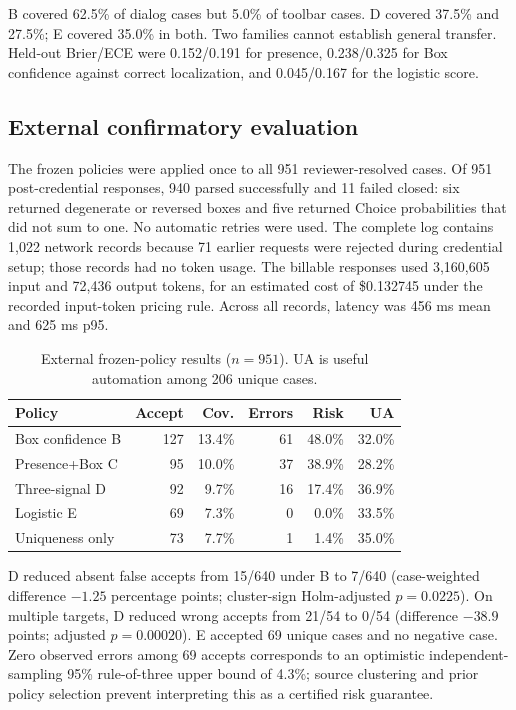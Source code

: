 \documentclass[10pt,twocolumn]{article}
\begin{document}
B covered 62.5\% of dialog cases but 5.0\% of toolbar cases. D covered 37.5\% and 27.5\%; E covered 35.0\% in both. Two families cannot establish general transfer. Held-out Brier/ECE were 0.152/0.191 for presence, 0.238/0.325 for Box confidence against correct localization, and 0.045/0.167 for the logistic score.

\subsection{External confirmatory evaluation}
The frozen policies were applied once to all 951 reviewer-resolved cases. Of 951 post-credential responses, 940 parsed successfully and 11 failed closed: six returned degenerate or reversed boxes and five returned Choice probabilities that did not sum to one. No automatic retries were used. The complete log contains 1,022 network records because 71 earlier requests were rejected during credential setup; those records had no token usage. The billable responses used 3,160,605 input and 72,436 output tokens, for an estimated cost of \$0.132745 under the recorded input-token pricing rule. Across all records, latency was 456 ms mean and 625 ms p95.

\begin{table}[t]
\centering
\caption{External frozen-policy results ($n=951$). UA is useful automation among 206 unique cases.}
\label{tab:external}
\small
\begin{tabular}{lrrrrr}
\toprule
Policy & Accept & Cov. & Errors & Risk & UA \\
\midrule
Box confidence B & 127 & 13.4\% & 61 & 48.0\% & 32.0\%\\
Presence+Box C & 95 & 10.0\% & 37 & 38.9\% & 28.2\%\\
Three-signal D & 92 & 9.7\% & 16 & 17.4\% & 36.9\%\\
Logistic E & 69 & 7.3\% & 0 & 0.0\% & 33.5\%\\
Uniqueness only & 73 & 7.7\% & 1 & 1.4\% & 35.0\%\\
\bottomrule
\end{tabular}
\end{table}

D reduced absent false accepts from 15/640 under B to 7/640 (case-weighted difference $-1.25$ percentage points; cluster-sign Holm-adjusted $p=0.0225$). On multiple targets, D reduced wrong accepts from 21/54 to 0/54 (difference $-38.9$ points; adjusted $p=0.00020$). E accepted 69 unique cases and no negative case. Zero observed errors among 69 accepts corresponds to an optimistic independent-sampling 95\% rule-of-three upper bound of 4.3\%; source clustering and prior policy selection prevent interpreting this as a certified risk guarantee.
\end{document}
